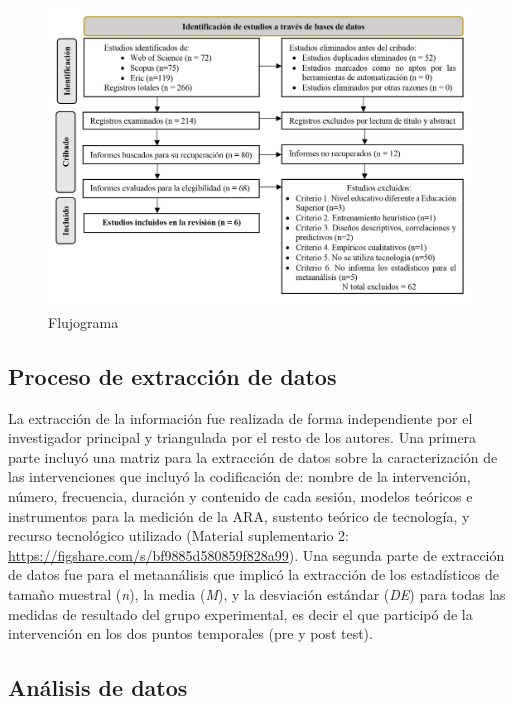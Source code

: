 \documentclass[spanish]{textolivre}
\begin{document}
\begin{figure}[htbp]
\centering
\begin{minipage}{\textwidth}
 \includegraphics[width=\textwidth]{Fig1.jpeg}
 \caption{Flujograma}
 \label{fig1}
\end{minipage}
\end{figure}


\subsection{Proceso de extracción de datos}

La extracción de la información fue realizada de forma independiente por el investigador principal y triangulada por el resto de los autores. Una primera parte incluyó una matriz para la extracción de datos sobre la caracterización de las intervenciones que incluyó la codificación de: nombre de la intervención, número, frecuencia, duración y contenido de cada sesión, modelos teóricos e instrumentos para la medición de la ARA, sustento teórico de tecnología, y recurso tecnológico utilizado (Material suplementario 2: \url{https://figshare.com/s/bf9885d580859f828a99}). Una segunda parte de extracción de datos fue para el metaanálisis que implicó la extracción de los estadísticos de tamaño muestral (\emph{n}), la media (\emph{M}), y la desviación estándar (\emph{DE}) para todas las medidas de resultado del grupo experimental, es decir el que participó de la intervención en los dos puntos temporales (pre y post test). 



\subsection{Análisis de datos}
\end{document}
